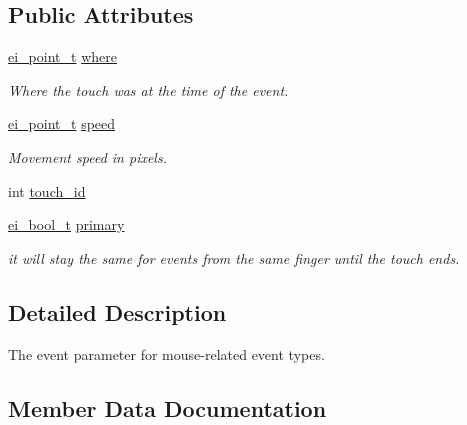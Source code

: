 \subsection*{Public Attributes}
\begin{DoxyCompactItemize}
\item 
\mbox{\label{structei__touch__event__t_a396ee9581e6e58e3462da797516ae928}} 
\hyperlink{structei__point__t}{ei\+\_\+point\+\_\+t} \hyperlink{structei__touch__event__t_a396ee9581e6e58e3462da797516ae928}{where}
\begin{DoxyCompactList}\small\item\em Where the touch was at the time of the event. \end{DoxyCompactList}\item 
\mbox{\label{structei__touch__event__t_af155f4e0e04c9a97ec519e1dbd5b1422}} 
\hyperlink{structei__point__t}{ei\+\_\+point\+\_\+t} \hyperlink{structei__touch__event__t_af155f4e0e04c9a97ec519e1dbd5b1422}{speed}
\begin{DoxyCompactList}\small\item\em Movement speed in pixels. \end{DoxyCompactList}\item 
int \hyperlink{structei__touch__event__t_a328a41ee9952d545b22c78047eaf09f6}{touch\+\_\+id}
\item 
\hyperlink{ei__types_8h_a383b9af13bd6a0a893096ead3c4d8e28}{ei\+\_\+bool\+\_\+t} \hyperlink{structei__touch__event__t_ad1ac5fff1b97acd2ef179412a753a517}{primary}
\begin{DoxyCompactList}\small\item\em it will stay the same for events from the same finger until the touch ends. \end{DoxyCompactList}\end{DoxyCompactItemize}


\subsection{Detailed Description}
The event parameter for mouse-\/related event types. 

\subsection{Member Data Documentation}
\mbox{\label{structei__touch__event__t_ad1ac5fff1b97acd2ef179412a753a517}} 

